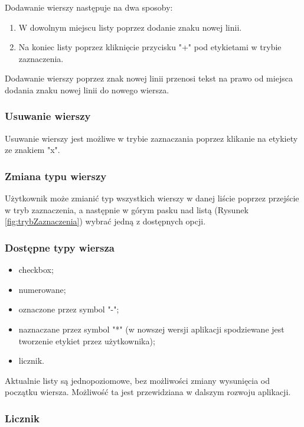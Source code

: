 Dodawanie wierszy następuje na dwa sposoby:

\begin{enumerate}
    \item W dowolnym miejscu listy poprzez dodanie znaku nowej linii.
    \item Na koniec listy poprzez kliknięcie przycisku "+" pod etykietami w trybie zaznaczenia. 
\end{enumerate}

Dodawanie wierszy poprzez znak nowej linii przenosi tekst na prawo od miejsca dodania znaku nowej linii do nowego wiersza.

\subsubsection{Usuwanie wierszy}

Usuwanie wierszy jest możliwe w trybie zaznaczania poprzez klikanie na etykiety ze znakiem "x".

\subsubsection{Zmiana typu wierszy}

Użytkownik może zmianić typ wszystkich wierszy w danej liście poprzez przejście w tryb zaznaczenia, a następnie w górym pasku nad listą (Rysunek \ref{fig:trybZaznaczenia}) wybrać jedną z dostępnych opcji.

\subsubsection{Dostępne typy wiersza}

\begin{itemize}
    \item checkbox;
    \item numerowane;
    \item oznaczone przez symbol "\--{}";
    \item naznaczane przez symbol "*" (w nowszej wersji aplikacji spodziewane jest tworzenie etykiet przez użytkownika);
    \item licznik.
\end{itemize}

Aktualnie listy są jednopoziomowe, bez możliwości zmiany wysunięcia od początku wiersza. Możliwość ta jest przewidziana w dalszym rozwoju aplikacji.

\subsubsection{Licznik}


